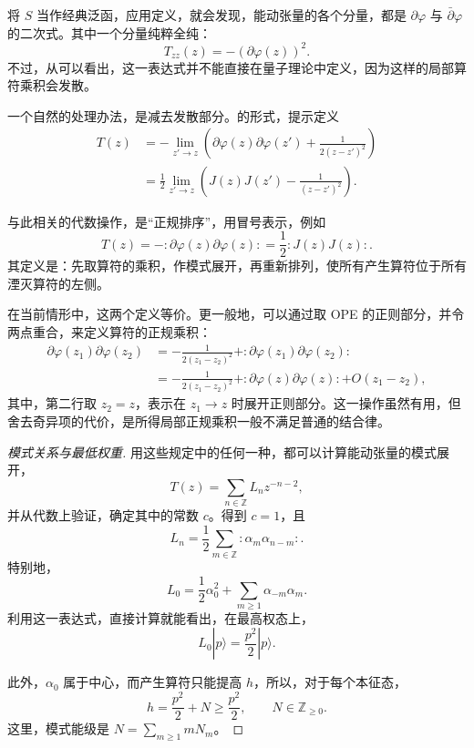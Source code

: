 将 $S$ 当作经典泛函，应用定义，就会发现，能动张量的各个分量，都是 $\partial\varphi$ 与 $\bar\partial\varphi$ 的二次式。其中一个分量纯粹全纯：
\[
T_{zz}(z)=-(\partial\varphi(z))^2.
\]
不过，从可以看出，这一表达式并不能直接在量子理论中定义，因为这样的局部算符乘积会发散。

一个自然的处理办法，是减去发散部分。的形式，提示定义
\begin{equation}\label{eq:3.49}
\begin{aligned}
T(z)&=-\lim_{z'\to z}
\left(\partial\varphi(z)\partial\varphi(z')
+\frac1{2(z-z')^2}\right)\\
&=\frac12\lim_{z'\to z}
\left(J(z)J(z')-\frac1{(z-z')^2}\right).
\end{aligned}
\end{equation}
\begin{definition*}\label{def:3.normal-ordering}
与此相关的代数操作，是“正规排序”，用冒号表示，例如
\[
T(z)=-:\partial\varphi(z)\partial\varphi(z):
=\frac12:J(z)J(z):.
\]
其定义是：先取算符的乘积，作模式展开，再重新排列，使所有产生算符位于所有湮灭算符的左侧。
\end{definition*}

在当前情形中，这两个定义等价。更一般地，可以通过取 OPE 的正则部分，并令两点重合，来定义算符的正规乘积：
\begin{equation}\label{eq:3.50}
\begin{aligned}
\partial\varphi(z_1)\partial\varphi(z_2)
&=-\frac1{2(z_1-z_2)^2}
+:\partial\varphi(z_1)\partial\varphi(z_2):\\
&=-\frac1{2(z_1-z_2)^2}
+:\partial\varphi(z)\partial\varphi(z):
+O(z_1-z_2),
\end{aligned}
\end{equation}
其中，第二行取 $z_2=z$，表示在 $z_1\to z$ 时展开正则部分。这一操作虽然有用，但舍去奇异项的代价，是所得局部正规乘积一般不满足普通的结合律。

\begin{proof}[模式关系与最低权重]
用这些规定中的任何一种，都可以计算能动张量的模式展开，
\[
T(z)=\sum_{n\in\mathbb{Z}}L_nz^{-n-2},
\]
并从代数上验证，确定其中的常数 $c$。得到 $c=1$，且
\[
L_n=\frac12\sum_{m\in\mathbb{Z}}:\alpha_m\alpha_{n-m}:.
\]
特别地，
\[
L_0=\frac12\alpha_0^2
+\sum_{m\ge1}\alpha_{-m}\alpha_m.
\]
利用这一表达式，直接计算就能看出，在最高权态上，
\begin{equation}\label{eq:3.51}
L_0|p\rangle=\frac{p^2}{2}|p\rangle.
\end{equation}

此外，$\alpha_0$ 属于中心，而产生算符只能提高 $h$，所以，对于每个本征态，
\begin{equation}\label{eq:3.52}
h=\frac{p^2}{2}+N\ge\frac{p^2}{2},
\qquad N\in\mathbb{Z}_{\ge0}.
\end{equation}
这里，模式能级是 $N=\sum_{m\ge1}mN_m$。
\end{proof}

